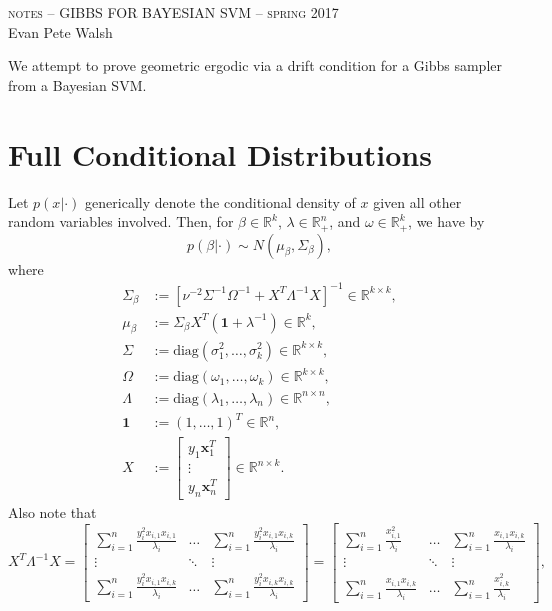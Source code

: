 \documentclass[12pt]{article}
\begin{document}
\thispagestyle{empty}
\begin{center}
  \Large \textsc{notes -- GIBBS FOR BAYESIAN SVM -- spring 2017} \\ 
  \vspace{5mm}
  \large Evan Pete Walsh
\end{center}
\vspace{1cm}

We attempt to prove geometric ergodic via a drift condition for a Gibbs sampler from a Bayesian SVM. 

\section{Full Conditional Distributions}

Let $p(x|\cdot)$ generically denote the conditional density of $x$ given all other random variables involved. Then, for $\beta \in \mathbb{R}^{k}$,
$\lambda \in \mathbb{R}_{+}^{n}$, and $\omega \in \mathbb{R}_{+}^{k}$, we have by \cite{svm}
\[
  p(\beta|\cdot) \sim N(\mu_{\beta}, \Sigma_{\beta}),
\]
where 
\begin{align*}
  \Sigma_{\beta} & := [\nu^{-2}\Sigma^{-1}\Omega^{-1} + X^{T}\Lambda^{-1} X]^{-1} \in \mathbb{R}^{k\times k}, \\
  \mu_{\beta} & := \Sigma_{\beta}X^{T}(\bm{1} + \lambda^{-1}) \in \mathbb{R}^{k}, \\
  \Sigma & := \text{diag}(\sigma_1^2,\dots, \sigma_k^2) \in \mathbb{R}^{k\times k}, \\
  \Omega & := \text{diag}(\omega_1, \dots, \omega_k) \in \mathbb{R}^{k\times k}, \\
  \Lambda & := \text{diag}(\lambda_1, \dots, \lambda_n) \in \mathbb{R}^{n\times n}, \\
  \bm{1} & := (1, \dots, 1)^T \in \mathbb{R}^{n}, \\
  X & := \begin{bmatrix}
    y_1 \bm{x}_1^T \\
    \vdots \\
    y_n \bm{x}_n^T 
  \end{bmatrix} \in \mathbb{R}^{n\times k}.
\end{align*}
Also note that 
\begin{equation}
  X^T \Lambda^{-1} X = \begin{bmatrix}
    \sum_{i=1}^{n}\frac{y_i^2 x_{i,1}x_{i,1}}{\lambda_i} & \dots & \sum_{i=1}^{n}\frac{ y_i^2 x_{i,1}x_{i,k}}{\lambda_i} \\
    \vdots & \ddots & \vdots \\
    \sum_{i=1}^{n} \frac{y_i^2 x_{i,1}x_{i,k}}{\lambda_i} & \dots & \sum_{i=1}^{n}\frac{y_i^2 x_{i,k}x_{i,k}}{\lambda_i}
  \end{bmatrix} = \begin{bmatrix}
    \sum_{i=1}^{n}\frac{x_{i,1}^2}{\lambda_i} & \dots & \sum_{i=1}^{n}\frac{ x_{i,1}x_{i,k}}{\lambda_i} \\
    \vdots & \ddots & \vdots \\
    \sum_{i=1}^{n} \frac{x_{i,1}x_{i,k}}{\lambda_i} & \dots & \sum_{i=1}^{n}\frac{ x_{i,k}^2}{\lambda_i}
  \end{bmatrix},
  \label{xtlx}
\end{equation}
\end{document}
